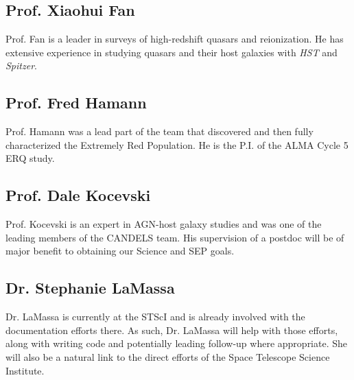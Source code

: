 \documentclass[11pt,a4paper]{article}
\begin{document}
\iffalse
\subsection*{Prof. Beth Biller}
Prof. Biller is an expert in infrared coronagraphic observations. 
While we do not intend to use the MIRI coronagraphs in this proposal, 
longer term observations would potentially involve observing the ERQs
with the Lyot or 4QPM if this became appropriate and technically feasible. 
\fi

\iffalse
\subsection*{Prof. Niel Brandt}
\fi


\subsection*{Prof. Xiaohui Fan}
Prof. Fan is a leader in surveys of high-redshift quasars and
reionization. He has extensive experience in studying quasars and
their host galaxies with {\it HST} and {\it Spitzer}.


\subsection*{Prof. Fred Hamann}
Prof. Hamann was a lead part of the team that discovered and then
fully characterized the Extremely Red Population. He is the P.I. of
the ALMA Cycle 5 ERQ study.


\subsection*{Prof. Dale Kocevski}
Prof. Kocevski is an expert in AGN-host galaxy studies and was 
one of the leading members of the CANDELS team. His supervision 
of a postdoc will be of major benefit to obtaining our Science and 
SEP goals. 


\iffalse
\subsection*{Prof. Linhua Jiang}
\fi


\subsection*{Dr. Stephanie LaMassa}
Dr. LaMassa is currently at the STScI and is already involved with the
documentation efforts there. As such, Dr. LaMassa will help with those
efforts, along with writing code and potentially leading follow-up
where appropriate. She will also be a natural link to the direct
efforts of the Space Telescope Science Institute.
\end{document}
